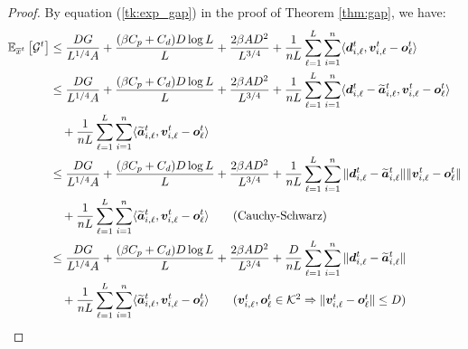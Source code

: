\begin{proof}
By equation (\ref{tk:exp_gap}) in the proof of Theorem \ref{thm:gap}, we have:
\begin{align*}
    \E_{\overline{x}^t}\left[ \mathcal{G}^t \right] 
    &\leq \frac{DG}{L^{1/4}A} + \frac{(\beta C_p + C_d) D \log L}{L} + \frac{2\beta AD^2}{L^{3/4}} + \frac{1}{nL}\sum_{\ell=1}^{L} \sum_{i=1}^n \langle \vect{d}_{i,\ell}^t, \vect{v}_{i,\ell}^t - \vect{o}_{\ell}^t \rangle\\
    &\leq \frac{DG}{L^{1/4}A} + \frac{(\beta C_p + C_d) D \log L}{L} + \frac{2\beta AD^2}{L^{3/4}} + \frac{1}{nL}\sum_{\ell=1}^{L} \sum_{i=1}^n \langle \vect{d}_{i,\ell}^t -\widetilde{\vect{a}}_{i,\ell}^t,\vect{v}_{i,\ell}^t - \vect{o}_{\ell}^t \rangle \\
     & \quad + \frac{1}{nL}\sum_{\ell=1}^{L} \sum_{i=1}^n \langle \widetilde{\vect{a}}_{i,\ell}^t,\vect{v}_{i,\ell}^t - \vect{o}_{\ell}^t \rangle\\
    &\leq \frac{DG}{L^{1/4}A} + \frac{(\beta C_p + C_d) D \log L}{L} + \frac{2\beta AD^2}{L^{3/4}} + \frac{1}{nL}\sum_{\ell=1}^{L} \sum_{i=1}^n \|\vect{d}_{i,\ell}^t -\widetilde{\vect{a}}_{i,\ell}^t\| \| \vect{v}_{i,\ell}^t - \vect{o}_{\ell}^t \| \\
     & \quad + \frac{1}{nL}\sum_{\ell=1}^{L} \sum_{i=1}^n \langle \widetilde{\vect{a}}_{i,\ell}^t,\vect{v}_{i,\ell}^t - \vect{o}_{\ell}^t \rangle
     \tag{Cauchy-Schwarz}\\
    &\leq \frac{DG}{L^{1/4}A} + \frac{(\beta C_p + C_d) D \log L}{L} + \frac{2\beta AD^2}{L^{3/4}} + \frac{D}{nL}\sum_{\ell=1}^{L} \sum_{i=1}^n \|\vect{d}_{i,\ell}^t -\widetilde{\vect{a}}_{i,\ell}^t\| \\
     & \quad + \frac{1}{nL}\sum_{\ell=1}^{L} \sum_{i=1}^n \langle \widetilde{\vect{a}}_{i,\ell}^t,\vect{v}_{i,\ell}^t - \vect{o}_{\ell}^t \rangle
     \tag{$\vect{v}_{i,\ell}^t, \vect{o}_{\ell}^t \in \mathcal{K}^2 \Rightarrow \| \vect{v}_{i,\ell}^t -  \vect{o}_{\ell}^t \| \leq D$}
\end{align*}


\end{proof}
